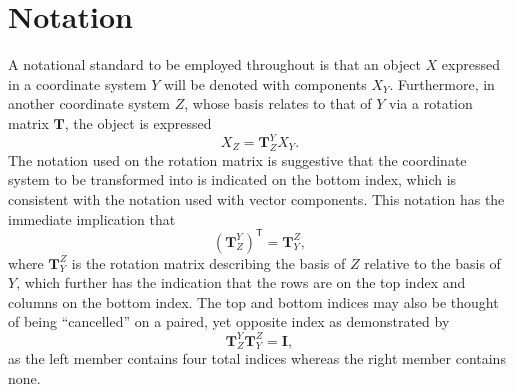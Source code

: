 \documentclass[11pt,dvipsnames]{thesis}
\begin{document}
\section{Notation}
A notational standard to be employed throughout is that an object $X$ expressed in a coordinate system $Y$ will be denoted with components $X_Y$. Furthermore, in another coordinate system $Z$, whose basis relates to that of $Y$ via a rotation matrix $\mathbf{T}$, the object is expressed 
\begin{equation}
X_Z = \mathbf{T}_Z^Y X_Y.
\end{equation}
The notation used on the rotation matrix is suggestive that the coordinate system to be transformed into is indicated on the bottom index, which is consistent with the notation used with vector components. This notation has the immediate implication that
\begin{equation}
(\mathbf{T}_Z^Y)^\mathsf{T} = \mathbf{T}_Y^Z,
\end{equation}
where $\mathbf{T}_Y^Z$ is the rotation matrix describing the basis of $Z$ relative to the basis of $Y$, which further has the indication that the rows are on the top index and columns on the bottom index. The top and bottom indices may also be thought of being ``cancelled'' on a paired, yet opposite index as demonstrated by
\begin{equation}
\mathbf{T}_Z^Y \mathbf{T}_Y^Z = \mathbf{I},
\end{equation}
as the left member contains four total indices whereas the right member contains none.
\end{document}
